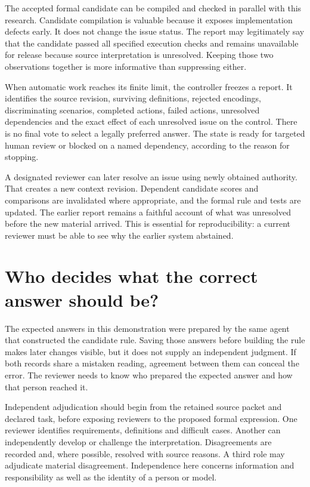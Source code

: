 The accepted formal candidate can be compiled and checked in parallel with this
research. Candidate compilation is valuable because it exposes implementation
defects early. It does not change the issue status. The report may legitimately
say that the candidate passed all specified execution checks and remains
unavailable for release because source interpretation is unresolved. Keeping
those two observations together is more informative than suppressing either.

When automatic work reaches its finite limit, the controller freezes a report.
It identifies the source revision, surviving definitions, rejected encodings,
discriminating scenarios, completed actions, failed actions, unresolved
dependencies and the exact effect of each unresolved issue on the control.
There is no final vote to select a legally preferred answer. The state is ready
for targeted human review or blocked on a named dependency, according to the
reason for stopping.

A designated reviewer can later resolve an issue using newly obtained authority.
That creates a new context revision. Dependent candidate scores and comparisons
are invalidated where appropriate, and the formal rule and tests are updated.
The earlier report remains a faithful account of what was unresolved before the
new material arrived. This is essential for reproducibility: a current reviewer
must be able to see why the earlier system abstained.

\section{Who decides what the correct answer should be?}
\label{merge:M02:08}

\label{sec:circular-independent}
The expected answers in this demonstration were prepared by the same agent that
constructed the candidate rule. Saving those answers before building the rule
makes later changes visible, but it does not supply an independent judgment.
If both records share a mistaken reading, agreement between them can conceal
the error. The reviewer needs to know who prepared the expected answer and how
that person reached it.

Independent adjudication should begin from the retained source packet and
declared task, before exposing reviewers to the proposed formal expression.
One reviewer identifies requirements, definitions and difficult cases. Another
can independently develop or challenge the interpretation. Disagreements are
recorded and, where possible, resolved with source reasons. A third role may
adjudicate material disagreement. Independence here concerns information and
responsibility as well as the identity of a person or model.

